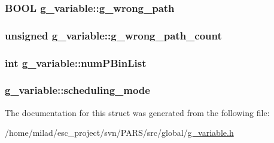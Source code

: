 \label{structg__variable_a72fd819583457322714db5dedb07fe69}
\hypertarget{structg__variable_aeeef678f78f34f8743dc14c035ef56dd}{
\subsubsection[{g\_\-wrong\_\-path}]{\setlength{\rightskip}{0pt plus 5cm}BOOL {\bf g\_\-variable::g\_\-wrong\_\-path}}}
\label{structg__variable_aeeef678f78f34f8743dc14c035ef56dd}
\hypertarget{structg__variable_a56cbb365fc7e39e093326334864e243a}{
\subsubsection[{g\_\-wrong\_\-path\_\-count}]{\setlength{\rightskip}{0pt plus 5cm}unsigned {\bf g\_\-variable::g\_\-wrong\_\-path\_\-count}}}
\label{structg__variable_a56cbb365fc7e39e093326334864e243a}
\hypertarget{structg__variable_a1b0b5933340788334ca1884e1e63707e}{
\subsubsection[{numPBinList}]{\setlength{\rightskip}{0pt plus 5cm}int {\bf g\_\-variable::numPBinList}}}
\label{structg__variable_a1b0b5933340788334ca1884e1e63707e}
\hypertarget{structg__variable_a7434e481853a0e26d1c95da57ca20608}{
\subsubsection[{scheduling\_\-mode}]{ {\bf g\_\-variable::scheduling\_\-mode}}}
\label{structg__variable_a7434e481853a0e26d1c95da57ca20608}


The documentation for this struct was generated from the following file:\begin{DoxyCompactItemize}
\item 
/home/milad/esc\_\-project/svn/PARS/src/global/\hyperlink{g__variable_8h}{g\_\-variable.h}\end{DoxyCompactItemize}
